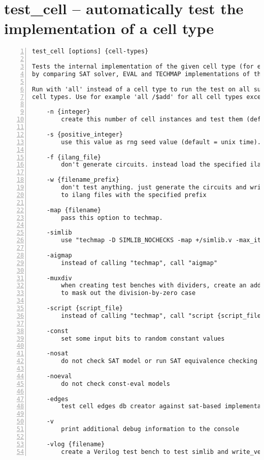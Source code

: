 \section{test\_cell -- automatically test the implementation of a cell type}
\label{cmd:test_cell}
\begin{lstlisting}[numbers=left,frame=single]
    test_cell [options] {cell-types}

Tests the internal implementation of the given cell type (for example '$add')
by comparing SAT solver, EVAL and TECHMAP implementations of the cell types..

Run with 'all' instead of a cell type to run the test on all supported
cell types. Use for example 'all /$add' for all cell types except $add.

    -n {integer}
        create this number of cell instances and test them (default = 100).

    -s {positive_integer}
        use this value as rng seed value (default = unix time).

    -f {ilang_file}
        don't generate circuits. instead load the specified ilang file.

    -w {filename_prefix}
        don't test anything. just generate the circuits and write them
        to ilang files with the specified prefix

    -map {filename}
        pass this option to techmap.

    -simlib
        use "techmap -D SIMLIB_NOCHECKS -map +/simlib.v -max_iter 2 -autoproc"

    -aigmap
        instead of calling "techmap", call "aigmap"

    -muxdiv
        when creating test benches with dividers, create an additional mux
        to mask out the division-by-zero case

    -script {script_file}
        instead of calling "techmap", call "script {script_file}".

    -const
        set some input bits to random constant values

    -nosat
        do not check SAT model or run SAT equivalence checking

    -noeval
        do not check const-eval models

    -edges
        test cell edges db creator against sat-based implementation

    -v
        print additional debug information to the console

    -vlog {filename}
        create a Verilog test bench to test simlib and write_verilog
\end{lstlisting}

